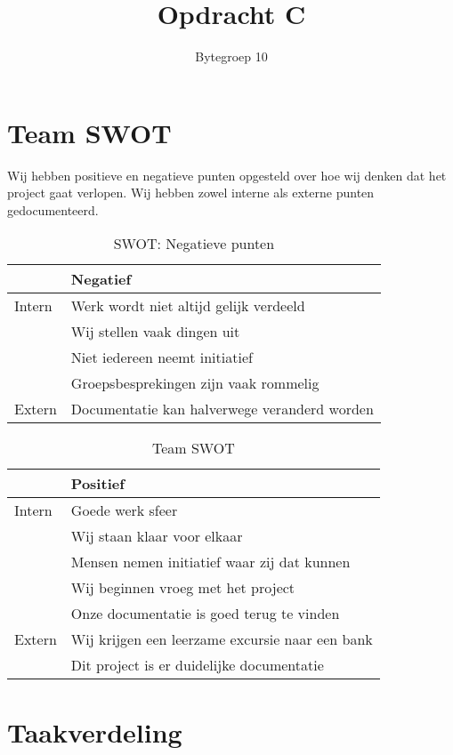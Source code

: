 \documentclass{article}
\title{Opdracht C}
\author{Bytegroep 10}
\begin{document}
\maketitle

\section{Team SWOT}

Wij hebben positieve en negatieve punten opgesteld over hoe wij denken dat het project gaat verlopen.
Wij hebben zowel interne als externe punten gedocumenteerd.

\begin{table}[h!]
\caption{SWOT: Negatieve punten}
\label{tab: Negatieve punten}
\begin{tabular}{l|l}
        & \textbf{Negatief}\\
        \hline
        {Intern} 	& Werk wordt niet altijd gelijk verdeeld \\
			& Wij stellen vaak dingen uit \\
			& Niet iedereen neemt initiatief \\
			& Groepsbesprekingen zijn vaak rommelig \\
        {Extern}	& Documentatie kan halverwege veranderd worden\\
\end{tabular}
\end{table}

\begin{table}[h!]
\caption{Team SWOT}
\label{tab: Team SWOT}
\begin{tabular}{l|l}
        & \textbf{Positief} \\
        \hline
        {Intern} 	& Goede werk sfeer \\ 
			& Wij staan klaar voor elkaar \\
			& Mensen nemen initiatief waar zij dat kunnen \\
			& Wij beginnen vroeg met het project \\
			& Onze documentatie is goed terug te vinden \\
        {Extern}	& Wij krijgen een leerzame excursie naar een bank \\
			& Dit project is er duidelijke documentatie \\	
\end{tabular}
\end{table}

\newpage

\section{Taakverdeling}
\end{document}
